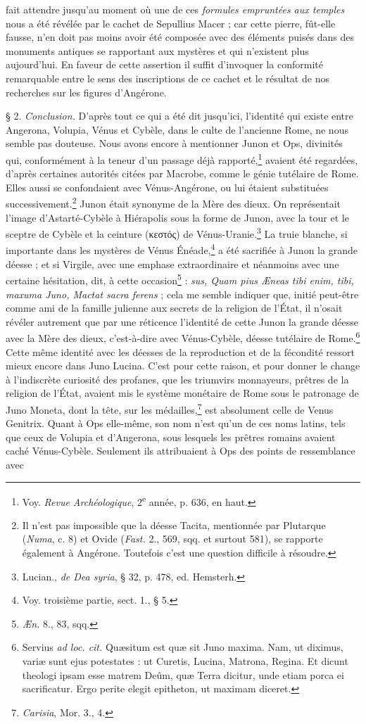 \documentclass[a4paper, 11pt, oneside, polutonikogreek, french]{article}
\begin{document}
fait attendre jusqu'au moment où une de ces \emph{formules empruntées aux temples} nous a été révélée par le cachet de Sepullius Macer ; car cette pierre, fût-elle fausse, n'en doit pas moins avoir été composée avec des éléments puisés dans des monuments antiques se rapportant aux mystères et qui n'existent plus aujourd'hui. En faveur de cette assertion il suffit d'invoquer la conformité remarquable entre le sens des inscriptions de ce cachet et le résultat de nos recherches sur les figures d'Angérone.

§ 2. \emph{Conclusion.} D'après tout ce qui a été dit jusqu'ici, l'identité qui existe entre Angerona, Volupia, Vénus et Cybèle, dans le culte de l'ancienne Rome, ne nous semble pas douteuse. Nous avons encore à mentionner Junon et Ops, divinités qui, conformément à la teneur d'un passage déjà rapporté,\footnote{Voy. \emph{Revue Archéologique}, 2\textsuperscript{e} année, p. 636, en haut.} avaient été regardées, d'après certaines autorités citées par Macrobe, comme le génie tutélaire de Rome. Elles aussi se confondaient avec Vénus-Angérone, ou lui étaient substituées successivement.\footnote{Il n'est pas impossible que la déesse Tacita, mentionnée par Plutarque (\emph{Numa}, c. 8) et Ovide (\emph{Fast.} 2., 569, sqq. et surtout 581), se rapporte également à Angérone. Toutefois c'est une question difficile à résoudre.} Junon était synonyme de la Mère des dieux. On représentait l'image d'Astarté-Cybèle à Hiérapolis sous la forme de Junon, avec la tour et le sceptre de Cybèle et la ceinture (κεστός) de Vénus-Uranie.\footnote{Lucian., \emph{de Dea syria}, § 32, p. 478, ed. Hemsterh.} La truie blanche, si importante dans les mystères de Vénus Énéade,\footnote{Voy. troisième partie, sect. 1., § 5.} a été sacrifiée à Junon la grande déesse ; et si Virgile, avec une emphase extraordinaire et néanmoins avec une certaine hésitation, dit, à cette occasion\footnote{\emph{Æn.} 8., 83, sqq.} : \emph{sus, Quam pius Æneas tibi enim, tibi, maxuma Juno, Mactat sacra ferens} ; cela me semble indiquer que, initié peut-être comme ami de la famille julienne aux secrets de la religion de l'État, il n'osait révéler autrement que par une réticence l'identité de cette Junon la grande déesse avec la Mère des dieux, c'est-à-dire avec Vénus-Cybèle, déesse tutélaire de Rome.\footnote{Servius \emph{ad loc. cit.} Quæsitum est quæ sit Juno maxima. Nam, ut diximus, variæ sunt ejus potestates : ut Curetis, Lucina, Matrona, Regina. Et dicunt theologi ipsam esse matrem Deûm, quæ Terra dicitur, unde etiam porca ei sacrificatur. Ergo perite elegit epitheton, ut maximam diceret.} Cette même identité avec les déesses de la reproduction et de la fécondité ressort mieux encore dans Juno Lucina. C'est pour cette raison, et pour donner le change à l'indiscrète curiosité des profanes, que les triumvirs monnayeurs, prêtres de la religion de l'État, avaient mis le système monétaire de Rome sous le patronage de Juno Moneta, dont la tête, sur les médailles,\footnote{\emph{Carisia}, Mor. 3., 4.} est absolument celle de Venus Genitrix. Quant à Ops elle-même, son nom n'est qu'un de ces noms latins, tels que ceux de Volupia et d'Angerona, sous lesquels les prêtres romains avaient caché Vénus-Cybèle. Seulement ils attribuaient à Ops des points de ressemblance avec 
\end{document}
